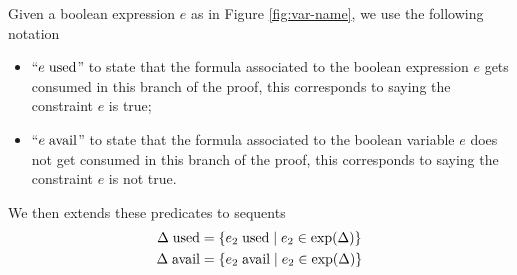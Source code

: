 \documentclass[a4paper, 12pt, tesi, english]{report}
\begin{document}
\begin{define}
	\label{def:used}
	Given a boolean expression $e$ as in Figure \ref{fig:var-name}, we use the following notation
	\begin{itemize}
		\item ``$e \; \text{used}$'' to state that the formula associated to the boolean expression $e$ gets consumed in this branch of the proof,
			this corresponds to saying the constraint $e$ is true;
		\item ``$e \; \text{avail}$'' to state that the formula associated to the boolean variable $e$ does not get consumed in this branch of the proof,
			this corresponds to saying the constraint $e$ is not true.
	\end{itemize}
	We then extends these predicates to sequents
	\begin{align*}
		\Delta \; \text{used} &= \{ e_2 \; \text{used} \mid e_2 \in \text{exp}(\Delta) \} \\
		\Delta \; \text{avail} &= \{ e_2 \; \text{avail} \mid e_2 \in \text{exp}(\Delta) \}
	\end{align*}
\end{define}
\end{document}
